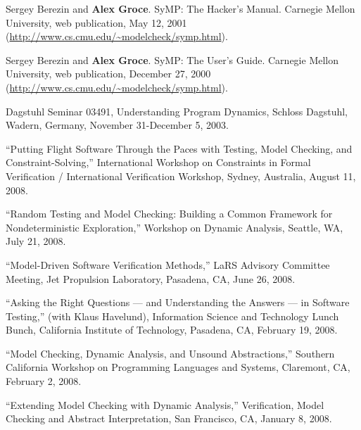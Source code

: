 \documentclass[ComputerScience]{vita}
\begin{document}
\begin{vita}
\begin{Technical Reports}
\item
Sergey Berezin and {\bf Alex Groce}.
\newblock SyMP: The Hacker's Manual.
\newblock Carnegie Mellon University, web publication, May 12, 2001 (\url{http://www.cs.cmu.edu/~modelcheck/symp.html}).

\item
Sergey Berezin and {\bf Alex Groce}.
\newblock SyMP: The User's Guide.
\newblock Carnegie Mellon University, web publication, December 27, 2000 (\url{http://www.cs.cmu.edu/~modelcheck/symp.html}).
\end{Technical Reports}

\begin{Invited Seminars}
  \item Dagstuhl Seminar 03491, Understanding Program Dynamics, Schloss Dagstuhl, Wadern, Germany, November 31-December 5, 2003.
\end{Invited Seminars}

\begin{Invited Talks}
\item ``Putting Flight Software Through the Paces with Testing, Model Checking, and Constraint-Solving,'' International Workshop on Constraints in Formal Verification / International Verification Workshop, Sydney, Australia, August 11, 2008.
\end{Invited Talks}

\begin{Selected Presentations}
\item ``Random Testing and Model Checking:   Building a Common Framework for Nondeterministic Exploration,'' Workshop on Dynamic Analysis, Seattle, WA, July 21, 2008.

\item ``Model-Driven Software Verification Methods,'' LaRS Advisory Committee Meeting, Jet Propulsion Laboratory, Pasadena, CA, June 26, 2008.

\item ``Asking the Right Questions --- and Understanding the Answers --- in Software Testing,'' (with Klaus Havelund), Information Science and Technology Lunch Bunch, California Institute of Technology, Pasadena, CA, February 19, 2008.

\item ``Model Checking, Dynamic Analysis, and Unsound Abstractions,'' Southern California Workshop on Programming Languages and Systems, Claremont, CA, February 2, 2008.

\item ``Extending Model Checking with Dynamic Analysis,'' Verification, Model Checking and Abstract Interpretation, San Francisco, CA, January 8, 2008.


\end{Selected Presentations}
\end{vita}
\end{document}
